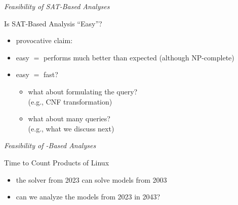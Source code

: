 \begin{frame}{\myframetitle}
	\begin{mycolumns}[t]
		\emph{Feasibility of SAT-Based Analyses}

		\begin{note}{Is SAT-Based Analysis ``Easy''?}
			\begin{itemize}
				\item provocative claim:  
				\item easy $=$ performs much better than expected (although NP-complete)
				\item easy $=$ fast?
				\begin{itemize}
					\item what about formulating the query?\\
						(e.g., CNF transformation)
					\item what about many queries?\\
						(e.g., what we discuss next)
				\end{itemize}
			\end{itemize}
		\end{note}
	\mynextcolumn
		\emph{Feasibility of \ssat{}-Based Analyses}
	
		\begin{exampletight}{Time to Count Products of Linux}
			\\[-7mm]
			\begin{itemize}
				\item the solver from 2023 can solve models from 2003 %
				\item can we analyze the models from 2023 in 2043?
			\end{itemize}
		\end{exampletight}
	\end{mycolumns}
\end{frame}


